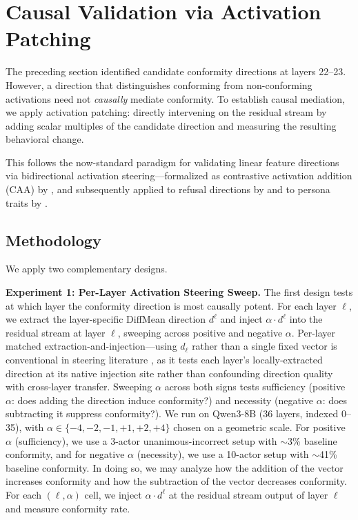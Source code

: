\section{Causal Validation via Activation Patching}
\label{sec:causal-validation-activation-patching}

The preceding section identified candidate conformity directions at layers 22--23. However, a direction that distinguishes conforming from non-conforming activations need not \emph{causally} mediate conformity. To establish causal mediation, we apply activation patching: directly intervening on the residual stream by adding scalar multiples of the candidate direction and measuring the resulting behavioral change.

This follows the now-standard paradigm for validating linear feature directions via bidirectional activation steering---formalized as contrastive activation addition (CAA) by \citet{panickssery2024caa}, and subsequently applied to refusal directions by \citet{arditi2024refusal} and to persona traits by \citet{chen2025persona}.

\subsection{Methodology}
\label{sec:causal-validation-methodology}

We apply two complementary designs.

\textbf{Experiment 1: Per-Layer Activation Steering Sweep.} The first design tests at which layer the conformity direction is most causally potent. For each layer $\ell$, we extract the layer-specific DiffMean direction $d^\ell$ and inject $\alpha \cdot d^\ell$ into the residual stream at layer $\ell$, sweeping across positive and negative $\alpha$. Per-layer matched extraction-and-injection---using $d_\ell$ rather than a single fixed vector is conventional in steering literature \citep{panickssery2024caa,chen2025persona}, as it tests each layer's locally-extracted direction at its native injection site rather than confounding direction quality with cross-layer transfer. Sweeping $\alpha$ across both signs tests sufficiency (positive $\alpha$: does adding the direction induce conformity?) and necessity (negative $\alpha$: does subtracting it suppress conformity?). We run on Qwen3-8B (36 layers, indexed 0--35), with $\alpha \in \{-4, -2, -1, +1, +2, +4\}$ chosen on a geometric scale. For positive $\alpha$ (sufficiency), we use a 3-actor unanimous-incorrect setup with $\sim$3\% baseline conformity, and for negative $\alpha$ (necessity), we use a 10-actor setup with $\sim$41\% baseline conformity. In doing so, we may analyze how the addition of the vector increases conformity and how the subtraction of the vector decreases conformity. For each $(\ell, \alpha)$ cell, we inject $\alpha \cdot d^\ell$ at the residual stream output of layer $\ell$ and measure conformity rate.

